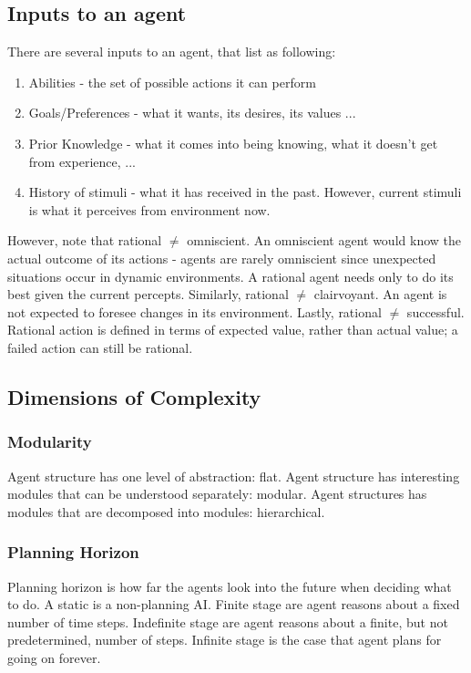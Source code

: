 \documentclass[a4paper]{article}
\theoremstyle{plain}
\theoremstyle{definition}
\theoremstyle{remark}
\begin{document}
\subsection{Inputs to an agent}
There are several inputs to an agent, that list as following:
\begin{enumerate}
	\item Abilities - the set of possible actions it can perform
	\item Goals/Preferences - what it wants, its desires, its values ...
	\item Prior Knowledge - what it comes into being knowing, what it doesn't get from experience, ...
	\item History of stimuli - what it has received in the past. However, current stimuli is what it perceives from environment now.
\end{enumerate}
However, note that rational $\neq $ omniscient. An omniscient agent would know the actual outcome of its actions - agents are rarely omniscient since unexpected situations occur in dynamic environments. A rational agent needs only to do its best given the current percepts. Similarly, rational $\neq $ clairvoyant. An agent is not expected to foresee changes in its environment. Lastly, rational $\neq $ successful. Rational action is defined in terms of expected value, rather than actual value; a failed action can still be rational. \\
\subsection{Dimensions of Complexity}
	\subsubsection{Modularity}
	Agent structure has one level of abstraction: flat. Agent structure has interesting modules that can be understood separately: modular. Agent structures has modules that are decomposed into modules: hierarchical. \\
	\subsubsection{Planning Horizon}
	Planning horizon is how far the agents look into the future when deciding what to do. A static is a non-planning AI. Finite stage are agent reasons about a fixed number of time steps. Indefinite stage are agent reasons about a finite, but not predetermined, number of steps. Infinite stage is the case that agent plans for going on forever.\\
\end{document}
